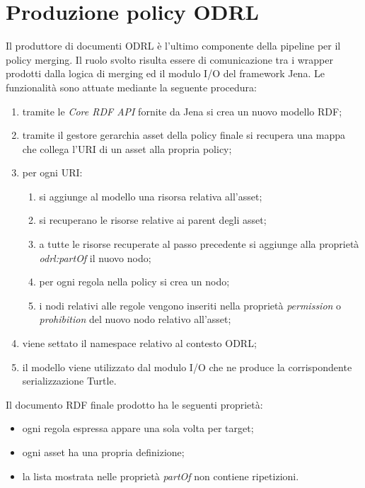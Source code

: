 \documentclass[12pt,a4paper,twoside]{book}
\begin{document}
\section{Produzione policy ODRL}\label{produceSection}
Il produttore di documenti ODRL è l'ultimo componente della pipeline per il policy merging. Il ruolo svolto risulta essere di comunicazione tra i wrapper prodotti dalla logica di merging ed il modulo I/O del framework Jena. Le funzionalità sono attuate mediante la seguente procedura:
\begin{enumerate}
\item tramite le \textit{Core RDF API} fornite da Jena si crea un nuovo modello RDF;
\item tramite il gestore gerarchia asset della policy finale si recupera una mappa che collega l'URI di un asset alla propria policy;
\item per ogni URI:
\begin{enumerate}
\item si aggiunge al modello una risorsa relativa all'asset;
\item si recuperano le risorse relative ai parent degli asset;
\item a tutte le risorse recuperate al passo precedente si aggiunge alla proprietà \textit{odrl:partOf} il nuovo nodo;
\item per ogni regola nella policy si crea un nodo;
\item i nodi relativi alle regole vengono inseriti nella proprietà \textit{permission} o \textit{prohibition} del nuovo nodo relativo all'asset;
\end{enumerate}
\item viene settato il namespace relativo al contesto ODRL;
\item il modello viene utilizzato dal modulo I/O che ne produce la corrispondente serializzazione Turtle.
\end{enumerate}
Il documento RDF finale prodotto ha le seguenti proprietà:
\begin{itemize}
\item ogni regola espressa appare una sola volta per target;
\item ogni asset ha una propria definizione;
\item la lista mostrata nelle proprietà \textit{partOf} non contiene ripetizioni.
\end{itemize}
\end{document}
